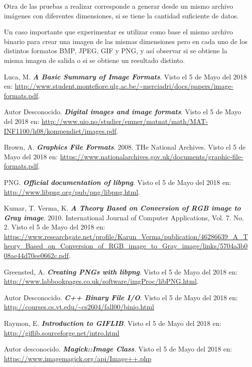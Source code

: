 Otra de las pruebas a realizar corresponde a generar desde un mismo archivo imágenes con diferentes dimensiones, si se tiene la cantidad suficiente de datos.

Un caso importante que experimentar es utilizar como base el mismo archivo binario para crear una imagen de las mismas dimensiones pero en cada uno de los distintos formatos BMP, JPEG, GIF y PNG, y así observar si se obtiene la misma imagen de salida o si se obtiene un resultado distinto.



\begin{thebibliography}{IEEE}
 Luca, M. \textbf{\textit{A Basic Summary of Image Formats}}.  Visto el 5 de Mayo del 2018 en: \url{http://www.student.montefiore.ulg.ac.be/~merciadri/docs/papers/image-formats.pdf}.

 Autor Desconocido. \textbf{\textit{Digital images and image formats}}. Visto el 5 de Mayo del 2018 en: \url{http://www.uio.no/studier/emner/matnat/math/MAT-INF1100/h08/kompendiet/images.pdf}.

 Brown, A. \textbf{\textit{Graphics File Formats}}. 2008. THe National Archives. Visto el 5 de Mayo del 2018 en: \url{https://www.nationalarchives.gov.uk/documents/graphic-file-formats.pdf}.

 PNG. \textit{\textbf{Official documentation of libpng}}. Visto el 5 de Mayo del 2018 en: \url{http://www.libpng.org/pub/png/libpng.html}. 

 Kumar, T. Verma, K. \textbf{\textit{A Theory Based on Conversion of RGB image to Gray
image}}. 2010. International Journal of Computer Applications, Vol. 7. No. 2. Visto el 5 de Mayo del 2018 en: \url{https://www.researchgate.net/profile/Karun_Verma/publication/46286639_A_Theory_Based_on_Conversion_of_RGB_image_to_Gray_image/links/5704a3b008ae44d70ee0662c.pdf}.

 Greensted, A. \textbf{\textit{Creating PNGs with libpng}}. Visto el 5 de Mayo del 2018 en: \url{http://www.labbookpages.co.uk/software/imgProc/libPNG.html}.

 Autor Desconocido. \textbf{\textit{C++ Binary File I/O}}. Visto el 5 de Mayo del 2018 en: \url{http://courses.cs.vt.edu/~cs2604/fall00/binio.html}

 Raymon, E. \textbf{\textit{Introduction to GIFLIB}}. Visto el 5 de Mayo del 2018 en: \url{http://giflib.sourceforge.net/intro.html}

 Autor desconocido. \textbf{\textit{Magick::Image Class}}. Visto el 5 de Mayo del 2018 en: \url{https://www.imagemagick.org/api/Image++.php}



\end{thebibliography}